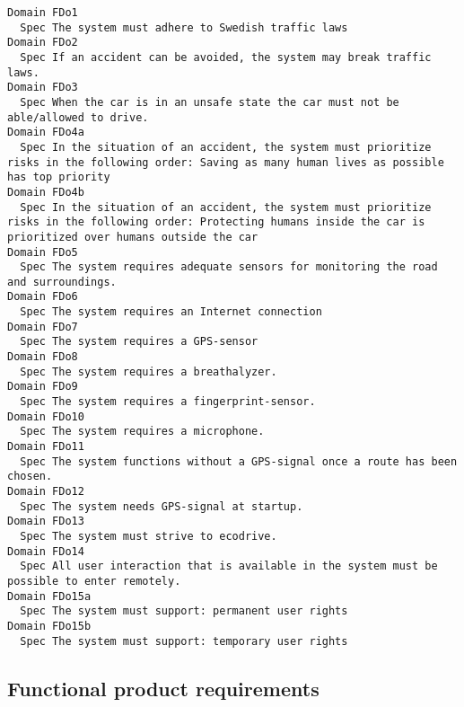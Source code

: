 \begin{lstlisting}
Domain FDo1
  Spec The system must adhere to Swedish traffic laws
Domain FDo2
  Spec If an accident can be avoided, the system may break traffic laws.
Domain FDo3
  Spec When the car is in an unsafe state the car must not be able/allowed to drive.
Domain FDo4a
  Spec In the situation of an accident, the system must prioritize risks in the following order: Saving as many human lives as possible has top priority
Domain FDo4b
  Spec In the situation of an accident, the system must prioritize risks in the following order: Protecting humans inside the car is prioritized over humans outside the car
Domain FDo5
  Spec The system requires adequate sensors for monitoring the road and surroundings.
Domain FDo6
  Spec The system requires an Internet connection
Domain FDo7
  Spec The system requires a GPS-sensor
Domain FDo8
  Spec The system requires a breathalyzer.
Domain FDo9
  Spec The system requires a fingerprint-sensor.
Domain FDo10
  Spec The system requires a microphone.
Domain FDo11
  Spec The system functions without a GPS-signal once a route has been chosen.
Domain FDo12
  Spec The system needs GPS-signal at startup.
Domain FDo13
  Spec The system must strive to ecodrive.
Domain FDo14
  Spec All user interaction that is available in the system must be possible to enter remotely.
Domain FDo15a
  Spec The system must support: permanent user rights
Domain FDo15b
  Spec The system must support: temporary user rights

\end{lstlisting}
    
        
       \subsection{Functional product requirements}


